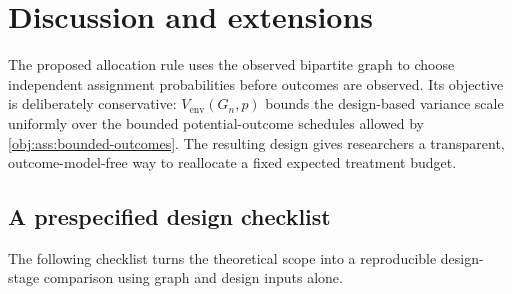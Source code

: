 \section{Discussion and extensions}

The proposed allocation rule uses the observed bipartite graph to choose independent assignment probabilities before outcomes are observed. Its objective is deliberately conservative: \(V_{\mathrm{env}}(G_n,p)\) bounds the design-based variance scale uniformly over the bounded potential-outcome schedules allowed by \cref{obj:ass:bounded-outcomes}. The resulting design gives researchers a transparent, outcome-model-free way to reallocate a fixed expected treatment budget.

\subsection{A prespecified design checklist}

The following checklist turns the theoretical scope into a reproducible design-stage comparison using graph and design inputs alone.

